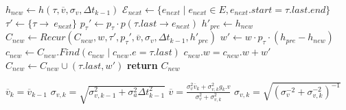 \begin{algorithm}
{\begin{minipage}{\textwidth}
\begin{algorithmic}[1]
        \State $h_{new}\leftarrow h(\tau,\overline{v},\sigma_v,\Delta t_{k-1})$ 
            \State $\mathcal{E}_{next} \gets \{e_{next}\mid e_{next}\in E, e_{next}.start=\tau.last.end\}$
                \State $\tau'\gets \{\tau\rightarrow\ e_{next}\}$
                \State $p_{\tau}' \gets p_\tau \cdot p(\tau.last\rightarrow e_{next})$ 
                \State $h'_{pre}\gets h_{new}$ 
                \State $C_{new}\gets Recur(C_{new},w,\tau',p_{\tau}',\overline{v},\sigma_v,\Delta t_{k-1}, h'_{pre})$
            \EndFor
        \EndIf 
        \State $w' \gets w\cdot p_{\tau}\cdot (h_{pre}-h_{new})$ 
        \State $c_{new}\gets C_{new}.Find(c_{new}\mid c_{new}.e=\tau .last)$
            \State $c_{new}.w=c_{new}.w+w'$ 
        \Else 
            \State $C_{new}\gets C_{new}\cup (\tau.last, w')$
        \EndIf
        \State \textbf{return} $C_{new}$
    \EndProcedure
        
     
        \State $\overline{v}_{k}=\overline{v}_{k-1}$ 
        \State $\sigma_{v,k}=\sqrt{\sigma^2_{v,k-1}+ \sigma^2_{a}\Delta t^2_{k-1}}$
        \State $\overline{v} = \frac{\sigma_v^2 \overline{v}_{k}+\sigma^2_{v,k} g_k.v} {\sigma_v^2+\sigma_{v,k}^2}$
        \State $\sigma_{v,k} =\sqrt{(\sigma^{-2}_v + \sigma^{-2}_{v,k})^{-1}}$
    \EndProcedure
\end{algorithmic}
\end{minipage}%
}
\end{algorithm}
